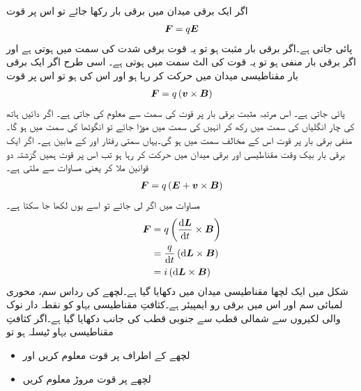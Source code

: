 اگر ایک برقی میدان میں برقی بار  رکھا جائے تو اس پر قوت
\begin{align}
{\ensuremath{{\boldsymbol{F}}}}=q {{\boldsymbol{E}}}
\end{align}
پائی جاتی ہے۔اگر برقی بار مثبت ہو تو یہ قوت برقی شدت  کی سمت میں ہوتی ہے اور اگر برقی بار منفی ہو تو یہ قوت  کی الٹ سمت میں ہوتی ہے۔ اسی طرح اگر ایک برقی بار مقناطیسی میدان میں حرکت کر رہا ہو اور اس کی   ہو تو اس پر قوت
\begin{align}\label{مساوات_برقی_میکانی_تبادلہ_مقناطیسی}
{\ensuremath{{\boldsymbol{F}}}}=q \left({{\boldsymbol{v}}} \times {\ensuremath{{\boldsymbol{B}}}} \right)
\end{align}
پائی جاتی ہے۔ اس مرتبہ مثبت برقی بار پر قوت کی سمت  سے معلوم کی جاتی ہے۔ اگر دائیں ہاتھ کی چار انگلیاں  کی سمت میں رکھ کر انہیں  کی سمت میں موڑا جائے تو انگوٹھا  کی سمت میں ہو گا۔ منفی برقی بار پر قوت اس کے مخالف سمت میں ہو گی۔یہاں سمتی رفتار  اور  کے مابین ہے۔ اگر ایک برقی بار بیک وقت مقناطیسی اور برقی میدان میں حرکت کر رہا ہو تب اس پر قوت ہمیں گزشتہ دو قوانین ملا کر یعنی مساوات   سے ملتی ہے۔
\begin{align}
{\ensuremath{{\boldsymbol{F}}}}=q \left({{\boldsymbol{E}}}+{{\boldsymbol{v}}} \times {\ensuremath{{\boldsymbol{B}}}}  \right)
\end{align}
مساوات   میں اگر  لی جائے تو اسے یوں لکھا جا سکتا ہے۔
\begin{gather}
\begin{aligned}
\kvec{F}&=q \left(\frac{\dif \kvec{L}}{\dif t} \times \kvec{B} \right)\\
&=\frac{q}{\dif t} \left(\dif \kvec{L} \times \kvec{B} \right)\\
&=i \left(\dif \kvec{L} \times \kvec{B}  \right)
\end{aligned}
\end{gather}
%
شکل  میں ایک لچھا مقناطیسی میدان میں دکھایا گیا ہے۔لچھے کی رداس  سم، محوری لمبائی  سم اور اس میں برقی رو   ایمپیئر ہے۔کثافتِ مقناطیسی بہاو کو نقطہ دار نوک والی لکیروں سے شمالی قطب سے جنوبی قطب کی جانب دکھایا گیا ہے۔اگر کثافتِ مقناطیسی بہاو  ٹیسلہ ہو تو 
\begin{itemize}
\item
لچھے کے اطراف پر قوت معلوم کریں اور
\item
لچھے پر قوت مروڑ  معلوم کریں
\end{itemize}
